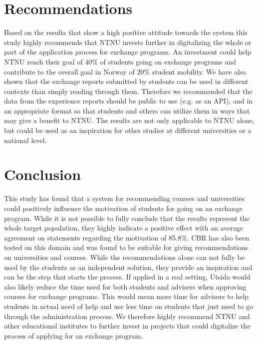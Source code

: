 \section{Recommendations}

Based on the results that show a high positive attitude towards the system this study highly recommends that NTNU invests further in digitalizing the whole or part of the application process for exchange programs. An investment could help NTNU reach their goal of 40\% of students going on exchange programs and contribute to the overall goal in Norway of 20\% student mobility. We have also shown that the exchange reports submitted by students can be used in different contexts than simply reading through them. Therefore we recommended that the data from the experience reports should be public to use (e.g. as an API), and in an appropriate format so that students and others can utilize them in ways that may give a benefit to NTNU. The results are not only applicable to NTNU alone, but could be used as an inspiration for other studies at different universities or a national level.

\section{Conclusion}

This study has found that a system for recommending courses and universities could positively influence the motivation of students for going on an exchange program. While it is not possible to fully conclude that the results represent the whole target population, they highly indicate a positive effect with an average agreement on statements regarding the motivation of 85.8\%. CBR has also been tested on this domain and was found to be suitable for giving recommendations on universities and courses. While the recommendations alone can not fully be used by the students as an independent solution, they provide an inspiration and can be the step that starts the process. If applied in a real setting, Utsida would also likely reduce the time used for both students and advisers when approving courses for exchange programs. This would mean more time for advisers to help students in actual need of help and use less time on students that just need to go through the administration process. We therefore highly recommend NTNU and other educational institutes to further invest in projects that could digitalize the process of applying for an exchange program.